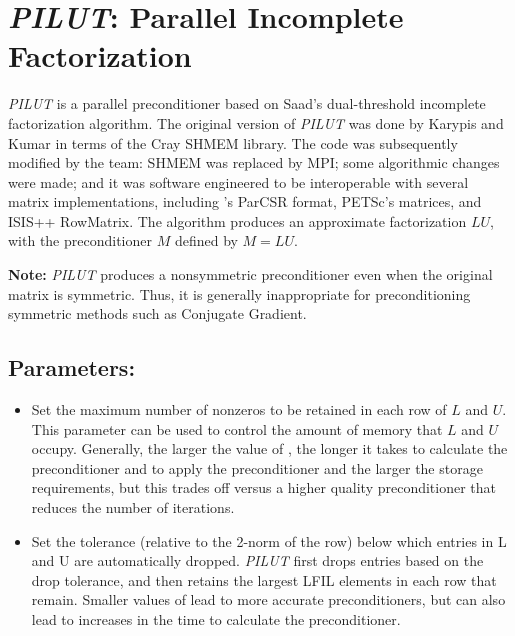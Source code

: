 \def\pilut{{\sl PILUT}}
\section{\pilut: Parallel Incomplete Factorization}
\label{PILUT}

\pilut{} is a parallel preconditioner based on Saad's dual-threshold incomplete
factorization algorithm. The original version of \pilut{} was done by
Karypis and Kumar \cite{KK1998} in terms of the Cray SHMEM library. The code
was subsequently modified by the \hypre{} team: SHMEM was replaced by
MPI; some algorithmic changes were made; and it was software
engineered to be interoperable with several matrix implementations,
including \hypre{}'s ParCSR format, PETSc's matrices, and ISIS++
RowMatrix. The algorithm produces an approximate factorization $ L U$,
with the preconditioner $M$ defined by $ M = L U $.

{\bf Note:} \pilut{} produces a nonsymmetric preconditioner even when the
original matrix is symmetric. Thus, it is generally inappropriate for
preconditioning symmetric methods such as Conjugate Gradient.

\subsection*{Parameters:}

\begin{itemize}

\item
{}
Set the maximum number of nonzeros to be retained in each row of $L$ and $U$.
This parameter can be used to control the amount of memory that $L$ and $U$
occupy. Generally, the larger the value of , the longer it takes to
calculate the preconditioner and to apply the preconditioner and the larger
the storage requirements, but this trades
off versus a higher quality preconditioner that reduces the number of
iterations.

\item
{}
Set the tolerance (relative to the 2-norm of the row) below which entries in L
and U are automatically dropped. \pilut{} first drops entries based on the drop
tolerance, and then retains the largest LFIL elements in each row that remain.
Smaller values of  lead to more accurate preconditioners, but can
also lead to increases in the time to calculate the preconditioner.

\end{itemize}

